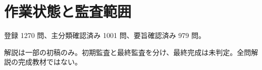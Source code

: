 \chapter{作業状態と監査範囲}
登録 1270 問、主分類確認済み 1001 問、要旨確認済み 979 問。
\par 解説は一部の初稿のみ。初期監査と最終監査を分け、最終完成は未判定。全問解説の完成教材ではない。
